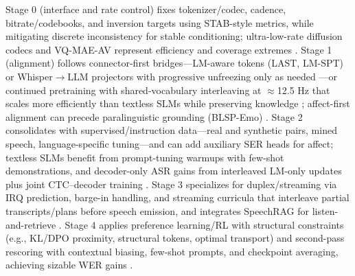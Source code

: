 \documentclass{article}
\begin{document}
Stage 0 (interface and rate control) fixes tokenizer/codec, cadence, bitrate/codebooks, and inversion targets using STAB-style metrics, while mitigating discrete inconsistency for stable conditioning; ultra-low-rate diffusion codecs and VQ-MAE-AV represent efficiency and coverage extremes \cite{vashishth2024stabspeechtokenizerassessmentbenchmark,liu2024analyzingmitigatinginconsistencydiscrete,wang2025tadicodectextawarediffusionspeechtokeniz,sadok2025vectorquantizedmaskedautoencoderaudiovis}. Stage 1 (alignment) follows connector-first bridges---LM-aware tokens (LAST, LM-SPT) or Whisper$\rightarrow$LLM projectors with progressive unfreezing only as needed \cite{turetzky2024lastlanguagemodelawarespeechtokenization,jo2025lmsptalignedsemanticdistillationspeechto,nguyen2025qwenvsgemmaintegrationwhispercomparative}---or continued pretraining with shared-vocabulary interleaving at $\approx$12.5 Hz that scales more efficiently than textless SLMs while preserving knowledge \cite{zeng2024scalingspeechtextpretrainingsyntheticint,maimon2025scalinganalysisinterleavedspeechtextlang,hassid2024textuallypretrainedspeechlanguagemodels,nachmani2024spokenquestionansweringspeechcontinuatio}; affect-first alignment can precede paralinguistic grounding (BLSP-Emo) \cite{wang2024blspemotowardsempatheticlargespeechlangu}. Stage 2 consolidates with supervised/instruction data---real and synthetic pairs, mined speech, language-specific tuning---and can add auxiliary SER heads for affect; textless SLMs benefit from prompt-tuning warmups with few-shot demonstrations, and decoder-only ASR gains from interleaved LM-only updates plus joint CTC--decoder training \cite{entry2025indicsuperbspeechprocessinguniversalperf,noroozi2024instructiondatagenerationunsupervisedada,lu2025desta2developinginstructionfollowingspee,wang2024blspemotowardsempatheticlargespeechlangu,hsu2024exploringcontextlearningtextlessspeechla,tsunoo2024decoderonlyarchitecturespeechrecognition}. Stage 3 specializes for duplex/streaming via IRQ prediction, barge-in handling, and streaming curricula that interleave partial transcripts/plans before speech emission, and integrates SpeechRAG for listen-and-retrieve \cite{ma2024languagemodelcanlistenwhilespeaking,zeng2024scalingspeechtextpretrainingsyntheticint,min2025speechretrievalaugmentedgenerationwithou}. Stage 4 applies preference learning/RL with structural constraints (e.g., KL/DPO proximity, structural tokens, optimal transport) and second-pass rescoring with contextual biasing, few-shot prompts, and checkpoint averaging, achieving sizable WER gains \cite{li2025seewossubmissionmlcslmlessonslearnedspee,xu2025optimaltransportregularizationspeechtext,sun2023contextualbiasingnamedentitieslargelangu}.
\end{document}
